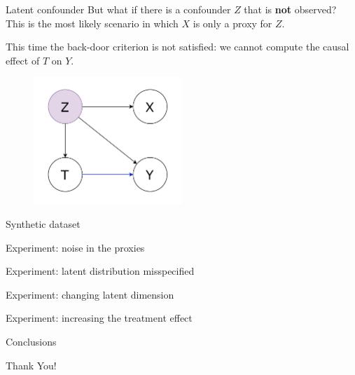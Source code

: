 \documentclass[10pt]{beamer}
\begin{document}
\begin{frame}{Latent confounder}
  But what if there is a confounder $Z$ that is \textbf{not} observed? This is the most likely scenario in which $X$ is only a proxy for $Z$.

  This time the back-door criterion is not satisfied: we cannot compute the causal effect of $T$ on $Y$.

  \begin{figure}
    \centering
    \includegraphics[width=0.5\textwidth]{images/latent.drawio.pdf}
  \end{figure}


\end{frame}

\begin{frame}{Synthetic dataset}
    
\end{frame}

\begin{frame}{Experiment: noise in the proxies}
    
\end{frame}

\begin{frame}{Experiment: latent distribution misspecified}
    
\end{frame}

\begin{frame}{Experiment: changing latent dimension}
    
\end{frame}

\begin{frame}{Experiment: increasing the treatment effect}
    
\end{frame}

\begin{frame}{Conclusions}
    
\end{frame}

{
\begin{frame}[standout]
\thispagestyle{empty}
  {\LARGE Thank You!}
\end{frame}
}
\end{document}
